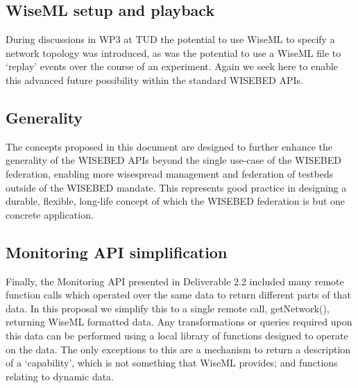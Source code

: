 		\subsection{WiseML setup and playback}
During discussions in WP3 at TUD the potential to use WiseML to specify a network topology was introduced, as was the potential to use a WiseML file to `replay' events over the course of an experiment. Again we seek here to enable this advanced future possibility within the standard WISEBED APIs.

		\subsection{Generality}
The concepts proposed in this document are designed to further enhance the generality of the WISEBED APIs beyond the single use-case of the WISEBED federation, enabling more wisespread management and federation of testbeds outside of the WISEBED mandate. This represents good practice in designing a durable, flexible, long-life concept of which the WISEBED federation is but one concrete application.

		\subsection{Monitoring API simplification}
Finally, the Monitoring API presented in Deliverable 2.2 included many remote function calls which operated over the same data to return different parts of that data. In this proposal we simplify this to a single remote call, getNetwork(), returning WiseML formatted data. Any transformations or queries required upon this data can be performed using a local library of functions designed to operate on the data. The only exceptions to this are a mechanism to return a description of a `capability', which is not something that WiseML provides; and functions relating to dynamic data.


